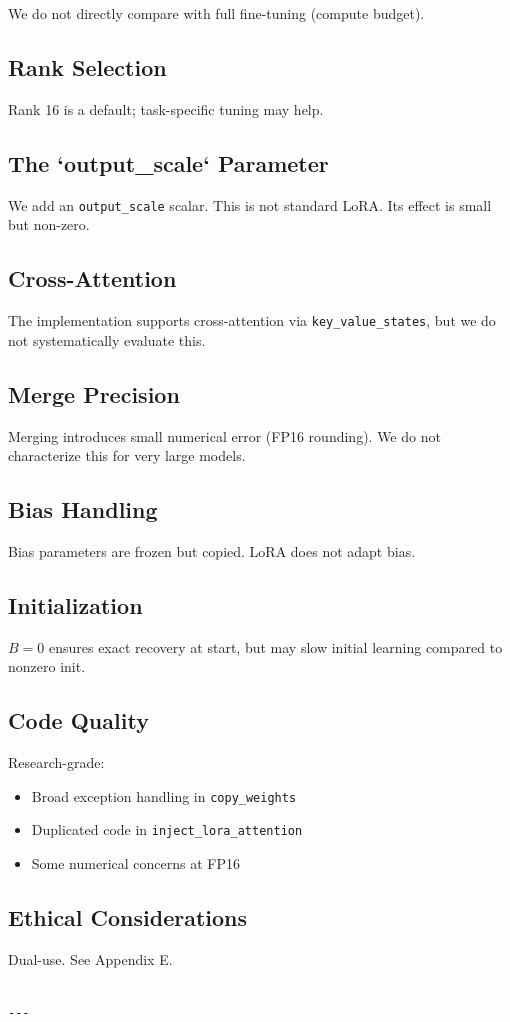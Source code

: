 We do not directly compare with full fine-tuning (compute budget). 

\subsection{Rank Selection}

Rank 16 is a default; task-specific tuning may help.

\subsection{The `output\_scale` Parameter}

We add an \texttt{output\_scale} scalar. This is not standard LoRA. Its effect is 
small but non-zero.

\subsection{Cross-Attention}

The implementation supports cross-attention via \texttt{key\_value\_states}, but 
we do not systematically evaluate this.

\subsection{Merge Precision}

Merging introduces small numerical error (FP16 rounding). We do not 
characterize this for very large models.

\subsection{Bias Handling}

Bias parameters are frozen but copied. LoRA does not adapt bias.

\subsection{Initialization}

$B = 0$ ensures exact recovery at start, but may slow initial learning 
compared to nonzero init.

\subsection{Code Quality}

Research-grade:
\begin{itemize}
\item Broad exception handling in \texttt{copy\_weights}
\item Duplicated code in \texttt{inject\_lora\_attention}
\item Some numerical concerns at FP16

\end{itemize}
\subsection{Ethical Considerations}

Dual-use. See Appendix E.
\begin{lstlisting}

---
\end{lstlisting}